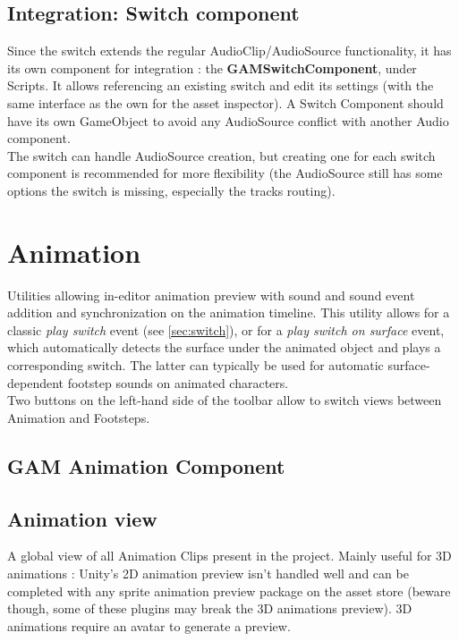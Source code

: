 \documentclass[a4paper,10pt]{article}
\begin{document}
\subsection{Integration: Switch component}
Since the switch extends the regular AudioClip/AudioSource functionality, it has its own component for integration : the \textbf{GAMSwitchComponent}, under Scripts. It allows referencing an existing switch and edit its settings (with the same interface as the own for the asset inspector). A Switch Component should have its own GameObject to avoid any AudioSource conflict with another Audio component. \\
The switch can handle AudioSource creation, but creating one for each switch component is recommended for more flexibility (the AudioSource still has some options the switch is missing, especially the tracks routing).


\section{Animation}


Utilities allowing in-editor animation preview with sound and sound event addition and synchronization on the animation timeline. This utility allows for a classic \textit{play switch} event (see \autoref{sec:switch}), or for a \textit{play switch on surface} event, which automatically detects the surface under the animated object and plays a corresponding switch. The latter can typically be used for automatic surface-dependent footstep sounds on animated characters. \\
Two buttons on the left-hand side of the toolbar allow to switch views between Animation and Footsteps.

\subsection{GAM Animation Component}

\subsection{Animation view}
A global view of all Animation Clips present in the project. Mainly useful for 3D animations : Unity's 2D animation preview isn't handled well and can be completed with any sprite animation preview package on the asset store (beware though, some of these plugins may break the 3D animations preview). 3D animations require an avatar to generate a preview.
\end{document}

